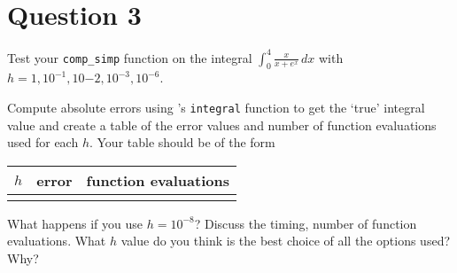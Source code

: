 \section{Question 3}

\begin{question}
    Test your \verb+comp_simp+ \MATLAB function on the integral $\int_{0}^{4}{\tfrac{x}{x+e^x}}\,dx$ with $h = 1,10^{-1},10{-2},10^{−3},10^{−6}$. 
    
    Compute absolute errors using \MATLAB’s \verb+integral+ function to get the ‘true’ integral value and create a table of the error values and number of function evaluations used for each $h$. Your table should be of the form
    \begin{tabular}
        {c|c|c}
        $h$ & error & function evaluations \\\hline
        & 
    \end{tabular}
    
    What happens if you use $h = 10^{−8}$? Discuss the timing, number of function evaluations. What $h$ value do you think is the best choice of all the options used? Why?
\end{question}

\begin{answer}
    
\end{answer}
